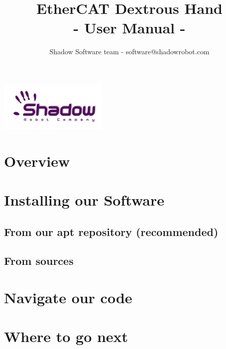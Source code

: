 \documentclass{article}
\title{EtherCAT Dextrous Hand \\
- User Manual -}
\author{Shadow Software team - software@shadowrobot.com}
\begin{document}
\begin{titlepage}

\maketitle
\vspace{5cm}
\begin{center}
\includegraphics{images/logo-shadowDB.png}
\end{center}
\end{titlepage}

\section{Overview}
\label{sec:overview}

\section{Installing our Software}
\label{sec:install}

\subsection{From our apt repository (recommended)}
\label{sec:install_apt}

\subsection{From sources}
\label{sec:install_src}

\section{Navigate our code}
\label{sec:navigate}

\section{Where to go next}
\label{sec:where_to_go}
\end{document}
